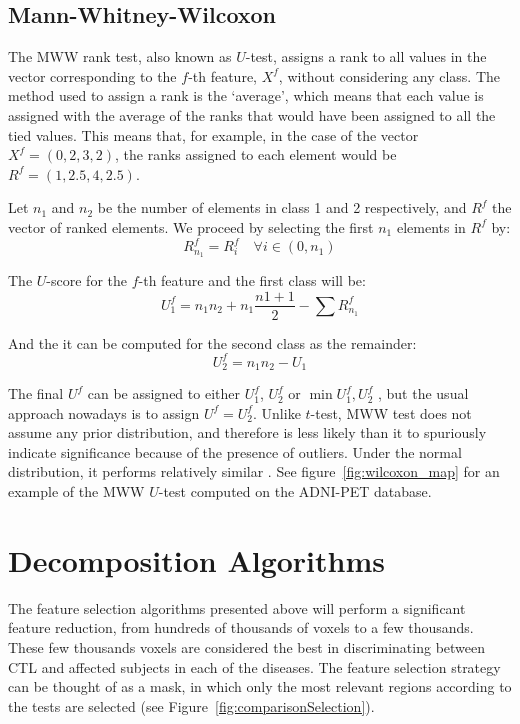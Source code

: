 \subsection{Mann-Whitney-Wilcoxon} 
The \acf{MWW} rank test, also known as $U$-test, assigns a rank to all values in the vector corresponding to the $f$-th feature, $X^f$, without considering any class. The method used to assign a rank is the `average', which means that each value is assigned with the average of the ranks that would have been assigned to all the tied values. This means that, for example, in the case of the vector $X^f=(0,2,3,2)$, the ranks assigned to each element would be $R^f=(1,2.5,4,2.5)$. 

Let $n_1$ and $n_2$ be the number of elements in class 1 and 2 respectively, and $R^f$ the vector of ranked elements. We proceed by selecting the first $n_1$ elements in $R^f$ by: 
\begin{equation}
R^f_{n_1} = {R^f_i} \quad \forall i\in(0,n_1)
\end{equation}

The $U$-score for the $f$-th feature and the first class will be: 
\begin{equation}
U_1^f = n_1 n_2 + n_1 \frac{n1+1}{2} - \sum R^f_{n_1}
\end{equation}

And the it can be computed for the second class as the remainder: 
\begin{equation}
U_2^f = n_1 n_2 - U_1
\end{equation}

The final $U^f$ can be assigned to either $U_1^f$, $U_2^f$ or $\min{U_1^f,U_2^f}$ \cite{Fay10}, but the usual approach nowadays is to assign $U^f=U_2^f$. Unlike $t$-test, \ac{MWW} test does not assume any prior distribution, and therefore is less likely than it to spuriously indicate significance because of the presence of outliers. Under the normal distribution, it performs relatively similar \cite{Fay10}. See figure~\ref{fig:wilcoxon_map} for an example of the \ac{MWW} $U$-test computed on the ADNI-PET database.

\section{Decomposition Algorithms}
The feature selection algorithms presented above will perform a significant feature reduction, from hundreds of thousands of voxels to a few thousands. These few thousands voxels are considered the best in discriminating between \ac{CTL} and affected subjects in each of the diseases. The feature selection strategy can be thought of as a mask, in which only the most relevant regions according to the tests are selected (see Figure~\ref{fig:comparisonSelection}). 


